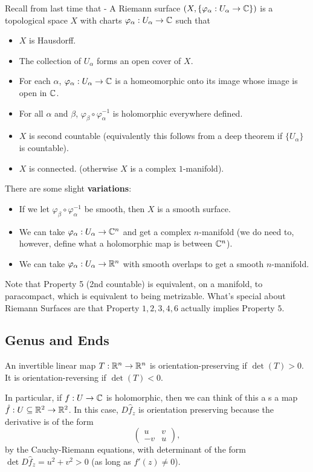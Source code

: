 \documentclass{article}
\begin{document}
Recall from last time that - A Riemann surface $(X, \{\varphi_\alpha: U_\alpha \to \mathbb{C}\})$ is a topological space $X$ with charts $\varphi_\alpha: U_\alpha \to \mathbb{C}$ such that
\begin{itemize}
    \item $X$ is Hausdorff.
    \item The collection of $U_\alpha$ forms an open cover of $X$.
    \item For each $\alpha$, $\varphi_\alpha: U_\alpha \to \mathbb{C}$ is a homeomorphic onto its image whose image is open in $\mathbb{C}$.
    \item For all $\alpha$ and $\beta$, $\varphi_\beta \circ \varphi_\alpha^{-1}$ is holomorphic everywhere defined.
    \item $X$ is second countable (equivalently this follows from a deep theorem if $\{U_\alpha\}$ is countable).
    \item $X$ is connected. (otherwise $X$ is a complex $1$-manifold).
\end{itemize}

There are some slight \textbf{variations}:
\begin{itemize}
    \item If we let $\varphi_\beta \circ \varphi_{\alpha}^{-1}$ be smooth, then $X$ is a smooth surface.
    \item We can take $\varphi_\alpha: U_\alpha \to \mathbb{C}^n$ and get a complex $n$-manifold (we do need to, however, define what a holomorphic map is between $\mathbb{C}^n$).
    \item We can take $\varphi_\alpha: U_\alpha \to \mathbb{R}^n$ with smooth overlaps to get a smooth $n$-manifold.
\end{itemize}

Note that Property 5 (2nd countable) is equivalent, on a manifold, to paracompact, which is equivalent to being metrizable. What's special about Riemann Surfaces are that Property $1, 2, 3, 4, 6$ actually implies Property $5$.

\subsection{Genus and Ends}

\begin{definition}
    An invertible linear map $T: \mathbb{R}^n \to \mathbb{R}^n$ is orientation-preserving if $\det(T) > 0$. It is orientation-reversing if $\det(T) < 0$.
\end{definition}

In particular, if $f: U \to \mathbb{C}$ is holomorphic, then we can think of this a s a map $\hat{f}: U \subseteq \mathbb{R}^2 \to \mathbb{R}^2$. In this case, $D \hat{f}_z$ is orientation preserving because the derivative is of the form
\[\begin{pmatrix}
    u & v\\
    -v & u
\end{pmatrix},\]
by the Cauchy-Riemann equations, with determinant of the form $\det D\hat{f}_z = u^2 + v^2 > 0$ (as long as $f'(z) \neq 0$).\\
\end{document}
